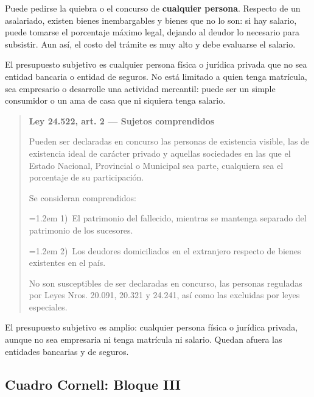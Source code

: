 \documentclass[12pt,oneside]{book}
\newenvironment{articulo}[1]
  {\begin{quote}\small\textbf{#1}\par\smallskip}
  {\end{quote}}
\newcommand{\inciso}[2]{\par\noindent\hangindent=1.2em\hangafter=1 #1)~#2}
\begin{document}
Puede pedirse la quiebra o el concurso de \textbf{cualquier persona}. Respecto de un asalariado, existen bienes inembargables y bienes que no lo son: si hay salario, puede tomarse el porcentaje máximo legal, dejando al deudor lo necesario para subsistir. Aun así, el costo del trámite es muy alto y debe evaluarse el salario.

El presupuesto subjetivo es cualquier persona física o jurídica privada que no sea entidad bancaria o entidad de seguros. No está limitado a quien tenga matrícula, sea empresario o desarrolle una actividad mercantil: puede ser un simple consumidor o un ama de casa que ni siquiera tenga salario.

\begin{articulo}{Ley 24.522, art. 2 --- Sujetos comprendidos}
Pueden ser declaradas en concurso las personas de existencia visible, las de existencia ideal de carácter privado y aquellas sociedades en las que el Estado Nacional, Provincial o Municipal sea parte, cualquiera sea el porcentaje de su participación.

Se consideran comprendidos:
\inciso{1}{El patrimonio del fallecido, mientras se mantenga separado del patrimonio de los sucesores.}
\inciso{2}{Los deudores domiciliados en el extranjero respecto de bienes existentes en el país.}

No son susceptibles de ser declaradas en concurso, las personas reguladas por Leyes Nros. 20.091, 20.321 y 24.241, así como las excluidas por leyes especiales.
\end{articulo}

\begin{important}
El presupuesto subjetivo es amplio: cualquier persona física o jurídica privada, aunque no sea empresaria ni tenga matrícula ni salario. Quedan afuera las entidades bancarias y de seguros.
\end{important}

\subsection*{Cuadro Cornell: Bloque III}
\end{document}
